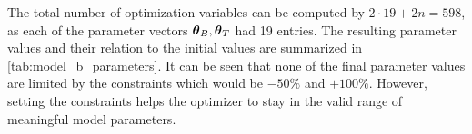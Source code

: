 The total number of optimization variables can be computed by $2\cdot 19 + 2n = 598$, as each of the parameter vectors $\boldsymbol{\theta}_B,\boldsymbol{\theta}_T$ had 19 entries. The resulting parameter values and their relation to the initial values are summarized in \cref{tab:model_b_parameters}. It can be seen that none of the final parameter values are limited by the constraints which would be $-50\%$ and $+100 \%$. However, setting the constraints helps the optimizer to stay in the valid range of meaningful model parameters.

\begin{table}[t] 
  \centering
  
    \begin{tabular}{@{}llllll@{}}
 

\end{tabular}
\end{table}
